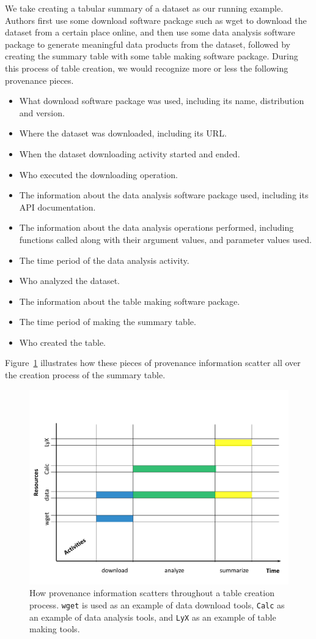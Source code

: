 We take creating a tabular summary of a dataset as our running example. Authors first use some 
download software package such as wget to download the dataset from a certain place online, and then 
use some data analysis software package to generate meaningful data products from the dataset, 
followed by creating the summary table with some table making software package. During this process 
of table creation, we would recognize more or less the following provenance pieces.
\begin{itemize}
\item What download software package was used, including its name, distribution and version.
\item Where the dataset was downloaded, including its URL.
\item When the dataset downloading activity started and ended.
\item Who executed the downloading operation.
\item The information about the data analysis software package used, including its API documentation.
\item The information about the data analysis operations performed, including functions called along 
with their argument values, and parameter values used. 
\item The time period of the data analysis activity.
\item Who analyzed the dataset.
\item The information about the table making software package.
\item The time period of making the summary table.
\item Who created the table.
\end{itemize}
Figure~\ref{prov-pieces} illustrates how these pieces of provenance information scatter all over the 
creation process of the summary table.
\begin{figure}
\centering
\includegraphics[scale=0.5]{prov-pieces}
\caption{How provenance information scatters throughout a table creation process. \texttt{wget} is used as an example of data download tools, \texttt{Calc} as an example of data analysis tools, and \texttt{LyX} as an example of table making tools.}
\label{prov-pieces}
\end{figure}
